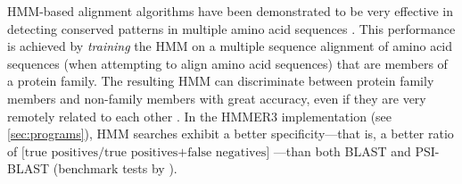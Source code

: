 HMM-based alignment algorithms have been demonstrated to be very effective in
detecting conserved patterns in multiple amino acid sequences \citep{eddy1995,
hughey1996}.  This performance is achieved by \emph{training} the HMM on a
multiple sequence alignment of amino acid sequences (when attempting to align
amino acid sequences) that are members of a protein family. The resulting HMM
can discriminate between protein family members and non-family members with
great accuracy, even if they are very remotely related to each other
\citep{karplus1998}. In the HMMER3 implementation (see \autoref{sec:programs}),
HMM searches exhibit a better specificity---that is, a better ratio of
$\textrm{[true positives/true positives+false negatives]}$
\citep{korf2004}---than both BLAST \citep{altschul1990} and PSI-BLAST
\citep{altschul1997} (benchmark tests by \citet{eddy2009}).

